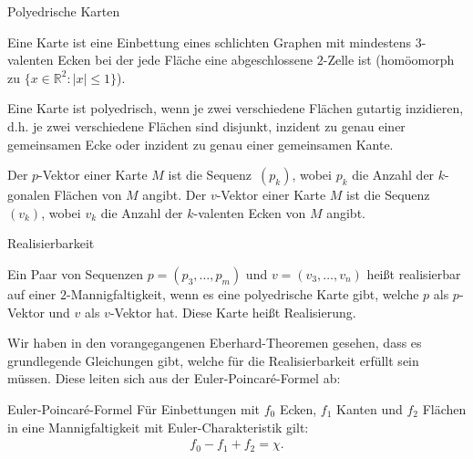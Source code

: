 \documentclass[10pt, notheorems]{beamer}
\newcommand{\set}[1]{\{ #1 \}}
\newcommand{\reals}{\mathbb{R}}
\newcommand{\hdef}[1]{\textcolor{darkred2}{#1}}
\begin{document}
\begin{frame}{Polyedrische Karten}
  \begin{definition}
    Eine \hdef{Karte} ist eine Einbettung eines schlichten Graphen mit mindestens $3$-valenten Ecken bei der jede Fläche eine abgeschlossene $2$-Zelle ist (homöomorph zu $\set{x \in \reals^2 : |x| \leq 1}$).
  \end{definition}
  \pause
  \begin{definition}
    Eine Karte ist \hdef{polyedrisch}, wenn je zwei verschiedene Flächen gutartig inzidieren, d.h. je zwei verschiedene Flächen sind disjunkt, inzident zu genau einer gemeinsamen Ecke oder inzident zu genau einer gemeinsamen Kante.
  \end{definition}
  \pause
  \begin{definition}
    Der \hdef{$p$-Vektor} einer Karte $M$ ist die Sequenz~$(p_k)$, wobei $p_k$ die Anzahl der $k$-gonalen Flächen von $M$ angibt. Der \hdef{$v$-Vektor} einer Karte $M$ ist die Sequenz~$(v_k)$, wobei $v_k$ die Anzahl der $k$-valenten Ecken von $M$ angibt.
  \end{definition}
\end{frame}
\begin{frame}{Realisierbarkeit}
  \begin{definition}
    Ein Paar von Sequenzen $p = (p_3, \dots, p_m)$ und $v = (v_3, \dots, v_n)$ heißt \hdef{realisierbar} auf einer $2$-Mannigfaltigkeit, wenn es eine polyedrische Karte gibt, welche $p$ als $p$-Vektor und $v$ als $v$-Vektor hat. Diese Karte heißt \hdef{Realisierung}.
  \end{definition}
  \pause
  Wir haben in den vorangegangenen {\sc Eberhard}-Theoremen gesehen, dass es grundlegende Gleichungen gibt, welche für die Realisierbarkeit erfüllt sein müssen. Diese leiten sich aus der {\sc Euler}-{\sc Poincaré}-Formel ab:
  \begin{block}{{\sc Euler}-{\sc Poincaré}-Formel}
    Für Einbettungen mit $f_0$ Ecken, $f_1$ Kanten und $f_2$ Flächen in eine Mannigfaltigkeit mit {\sc Euler}-Charakteristik gilt:
    \begin{align*}
      f_0 - f_1 + f_2 = \chi.
    \end{align*}
  \end{block}
\end{frame}
\end{document}
